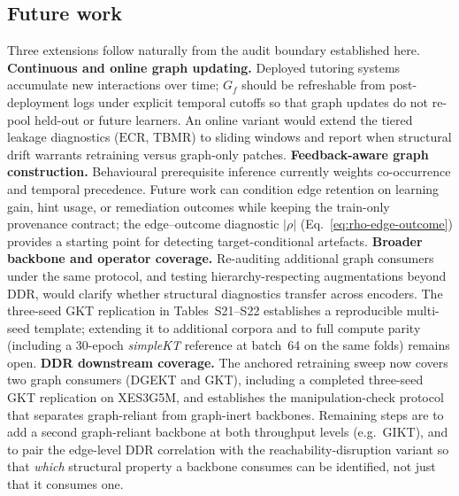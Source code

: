 \documentclass[pdflatex,sn-mathphys-num]{sn-jnl}
\newcommand{\DDR}{\textsc{DDR}}
\begin{document}
\subsection{Future work}
\label{sec:future-work}
Three extensions follow naturally from the audit boundary established here.
\textbf{Continuous and online graph updating.} Deployed tutoring systems
accumulate new interactions over time; $G_f$ should be refreshable from
post-deployment logs under explicit temporal cutoffs so that graph updates
do not re-pool held-out or future learners. An online variant would extend
the tiered leakage diagnostics ($\mathrm{ECR}$, TBMR) to sliding windows
and report when structural drift warrants retraining versus graph-only
patches.
\textbf{Feedback-aware graph construction.} Behavioural prerequisite
inference currently weights co-occurrence and temporal precedence. Future
work can condition edge retention on learning gain, hint usage, or
remediation outcomes while keeping the train-only provenance contract;
the edge--outcome diagnostic $|\rho|$ (Eq.~\eqref{eq:rho-edge-outcome})
provides a starting point for detecting target-conditional artefacts.
\textbf{Broader backbone and operator coverage.} Re-auditing additional
graph consumers under the same protocol, and testing hierarchy-respecting
augmentations beyond \DDR{}, would clarify whether structural diagnostics
transfer across encoders. The three-seed GKT replication in Tables~S21--S22
establishes a reproducible multi-seed template; extending it to additional
corpora and to full compute parity (including a 30-epoch \textit{simpleKT}
reference at batch~64 on the same folds) remains open.
\textbf{\DDR{} downstream coverage.} The anchored retraining sweep now covers
two graph consumers (DGEKT and GKT), including a completed three-seed GKT
replication on XES3G5M, and establishes the manipulation-check protocol that
separates graph-reliant from graph-inert backbones. Remaining steps are to add a
second graph-reliant backbone at both throughput levels (e.g.\ GIKT), and to pair
the edge-level \DDR{} correlation with the reachability-disruption variant so that
\emph{which} structural property a backbone consumes can be identified, not just
that it consumes one.

\end{document}
